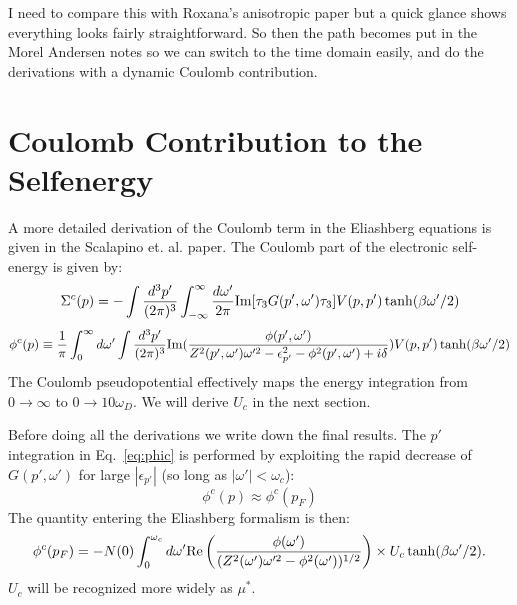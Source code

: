 \documentclass{article}
\begin{document}
I need to compare this with Roxana's anisotropic paper but a quick glance shows everything looks
fairly straightforward. So then the path becomes put in the Morel Andersen notes so we can switch
to the time domain easily, and do the derivations with a dynamic Coulomb contribution. 

\section{Coulomb Contribution to the Selfenergy}
%
A more detailed derivation of the Coulomb term in the Eliashberg equations
is given in the Scalapino et. al. paper.
%
The Coulomb part of the electronic self-energy is given by:
%
\begin{equation}
\Sigma^{c}(p) = - \int \frac{d^{3}p'}{(2\pi)^{3}}\int_{-\infty}^{\infty}\frac{d\omega'}{2\pi}{\rm Im}[\tau_{3}G(p',\omega')\tau_{3}] V(p,p')\tanh(\beta\omega'/2)
\end{equation}
%
\begin{equation}
\label{eq:phic}
\phi^{c}(p)\equiv \frac{1}{\pi}\int_{0}^{\infty}d\omega'\int\frac{d^{3}p'}{(2\pi)^{3}}
{\rm Im}(\frac{\phi(p',\omega')}{Z^{2}(p',\omega')\omega'^{2} -\epsilon^{2}_{p'}-\phi^{2}(p',\omega')+i\delta})
V(p,p') \tanh(\beta\omega'/2)
\end{equation}
%
The Coulomb pseudopotential effectively maps the energy integration from
$0\rightarrow \infty$ to $0 \rightarrow 10 \omega_{D}$. We will derive $U_{c}$ in
the next section.

Before doing all the derivations we write down the final results. The $p'$ integration in
Eq.~\ref{eq:phic} is performed by exploiting the rapid decrease of $G(p',\omega')$ 
for large $|\epsilon_{p'}|$ (so long as $|\omega'|<\omega_{c}$):
%
\begin{equation}
\phi^{c}(p) \approx \phi^{c}(p_{F})
\end{equation}
%
The quantity entering the Eliashberg formalism is then:
\begin{eqnarray}
\phi^{c}(p_{F}) =  -N(0) \int_{0}^{\omega_{c}}d\omega' {\rm Re}\left(\frac{\phi(\omega')}{(Z^{2}(\omega')\omega'^{2} - \phi^{2}(\omega'))^{1/2}}\right)
\times U_{c} \tanh(\beta\omega'/2).
\end{eqnarray}
%
$U_{c}$ will be recognized more widely as $\mu^{*}$.
%
\end{document}
